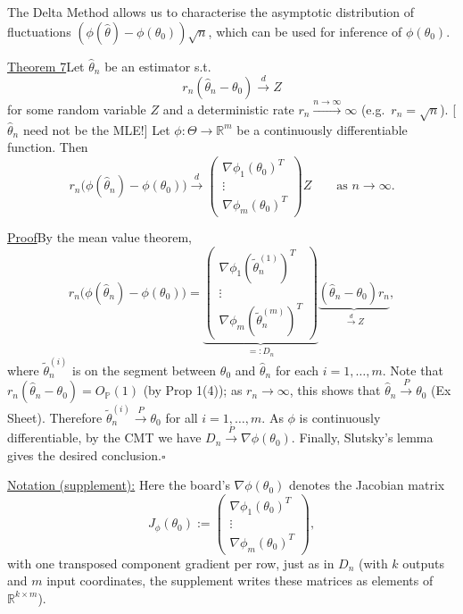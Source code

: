 \documentclass[11pt,a4paper]{article}
\begin{document}
The Delta Method allows us to characterise the asymptotic distribution of
fluctuations $(\phi(\hat\theta)-\phi(\theta_0))\sqrt n$, which can be used
for inference of $\phi(\theta_0)$.

\medskip
\noindent\underline{Theorem 7}\quad Let $\hat\theta_n$ be an estimator s.t.
\[
r_n(\hat\theta_n-\theta_0)\xrightarrow{d}Z
\]
for some random variable $Z$ and a deterministic rate $r_n\xrightarrow{n\to\infty}\infty$
(e.g.\ $r_n=\sqrt n$). [$\hat\theta_n$ need not be the MLE!]
Let $\phi:\Theta\to\mathbb R^m$ be a continuously differentiable function. Then
\[
r_n\bigl(\phi(\hat\theta_n)-\phi(\theta_0)\bigr)
\xrightarrow{d}
\begin{pmatrix}
\nabla\phi_1(\theta_0)^T\\
\vdots\\
\nabla\phi_m(\theta_0)^T
\end{pmatrix}Z
\qquad\text{as }n\to\infty.
\]

\noindent\underline{Proof}\quad By the mean value theorem,
\[
r_n\bigl(\phi(\hat\theta_n)-\phi(\theta_0)\bigr)
=\underbrace{\begin{pmatrix}
\nabla\phi_1(\tilde\theta_n^{(1)})^T\\
\vdots\\
\nabla\phi_m(\tilde\theta_n^{(m)})^T
\end{pmatrix}}_{=:D_n}
\underbrace{(\hat\theta_n-\theta_0)r_n}_{\xrightarrow{d}Z},
\]
where $\tilde\theta_n^{(i)}$ is on the segment between $\theta_0$ and
$\hat\theta_n$ for each $i=1,\ldots,m$.
Note that $r_n(\hat\theta_n-\theta_0)=O_{\mathbb P}(1)$ (by Prop 1(4));
as $r_n\to\infty$, this shows that $\hat\theta_n\xrightarrow{P}\theta_0$
(Ex Sheet). Therefore $\tilde\theta_n^{(i)}\xrightarrow{P}\theta_0$
for all $i=1,\ldots,m$.
As $\phi$ is continuously differentiable, by the CMT we have
$D_n\xrightarrow{P}\nabla\phi(\theta_0)$.
Finally, Slutsky's lemma gives the desired conclusion.\hfill$\square$

\medskip
\noindent\underline{Notation (supplement):}\quad
Here the board's $\nabla\phi(\theta_0)$ denotes the Jacobian matrix
\[
J_\phi(\theta_0):=
\begin{pmatrix}
\nabla\phi_1(\theta_0)^T\\
\vdots\\
\nabla\phi_m(\theta_0)^T
\end{pmatrix},
\]
with one transposed component gradient per row, just as in $D_n$
(with $k$ outputs and $m$ input coordinates, the supplement writes these
matrices as elements of $\mathbb R^{k\times m}$).
\end{document}
